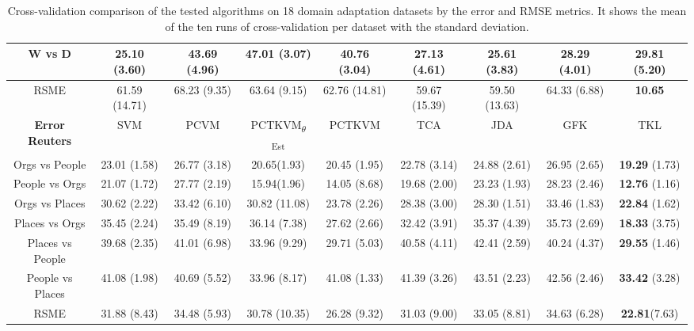\begin{table}[]
{\begin{tabular}{@{}ccccccccc@{}}
			W vs D                 & \textbf{25.10} (3.60)& 43.69 (4.96)& 47.01 (3.07)& 40.76  (3.04)& 27.13          (4.61)& 25.61 (3.83)& 28.29 (4.01)& 29.81   (5.20)       \\\midrule
			RSME                   & 61.59          (14.71)& 68.23 (9.35)& 63.64 (9.15)& 62.76  (14.81)& 59.67          (15.39)& 59.50 (13.63)& 64.33 (6.88)& \textbf{10.65} \\\midrule
			\textbf{Error Reuters} & SVM            & PCVM  & PCTKVM\textsubscript{$\theta$Est} & PCTKVM & TCA            & JDA   & GFK   & TKL            \\
			Orgs vs People         & 23.01          (1.58)& 26.77 (3.18)& 20.65(1.93)& 20.45  (1.95)& 22.78          (3.14)& 24.88 (2.61)& 26.95 (2.65)& \textbf{19.29} (1.73)\\
			People vs Orgs         & 21.07          (1.72)& 27.77 (2.19)& 15.94(1.96)& 14.05  (8.68)& 19.68          (2.00)& 23.23 (1.93)& 28.23 (2.46)& \textbf{12.76} (1.16)\\
			Orgs vs Places         & 30.62          (2.22)& 33.42 (6.10)& 30.82 (11.08)& 23.78  (2.26)& 28.38          (3.00)& 28.30 (1.51)& 33.46 (1.83)& \textbf{22.84} (1.62)\\
			Places vs Orgs         & 35.45          (2.24)& 35.49 (8.19)& 36.14 (7.38)& 27.62  (2.66)& 32.42          (3.91)& 35.37 (4.39)& 35.73 (2.69)& \textbf{18.33} (3.75)\\
			Places vs People       & 39.68          (2.35)& 41.01 (6.98)& 33.96 (9.29)& 29.71  (5.03)& 40.58          (4.11)& 42.41 (2.59)& 40.24 (4.37)& \textbf{29.55} (1.46)\\
			People vs Places       & 41.08          (1.98)& 40.69 (5.52)& 33.96 (8.17)& 41.08  (1.33)& 41.39          (3.26)& 43.51 (2.23)& 42.56 (2.46)& \textbf{33.42} (3.28)\\\midrule
			RSME                   & 31.88          (8.43)& 34.48 (5.93)&  30.78 (10.35)& 26.28  (9.32)& 31.03          (9.00)& 33.05 (8.81)& 34.63 (6.28)& \textbf{22.81}(7.63) \\ \bottomrule
	\end{tabular}}
	\caption[Complete Cross-Validtion Result of Error]{Cross-validation comparison of the tested algorithms on 18 domain adaptation datasets by the error and \acs{RMSE} metrics. It shows the mean of the ten runs of cross-validation per dataset with the standard deviation.\label{BTableFTErr}}
\end{table}

